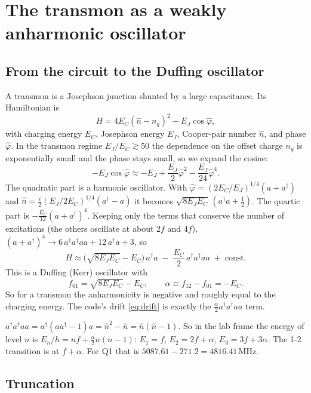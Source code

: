 \documentclass[11pt,a4paper]{article}
\newcommand{\ad}{a^{\dagger}}
\newcommand{\MHz}{\,\mathrm{MHz}}
\begin{document}
\section{The transmon as a weakly anharmonic oscillator}\label{sec:transmon}

\subsection{From the circuit to the Duffing oscillator}

A transmon is a Josephson junction shunted by a large capacitance. Its Hamiltonian is \cite{koch2007}
\[
H = 4E_C(\hat n - n_g)^2 - E_J\cos\hat\varphi ,
\]
with charging energy \(E_C\), Josephson energy \(E_J\), Cooper-pair number \(\hat n\), and phase \(\hat\varphi\). In the
transmon regime \(E_J/E_C \gtrsim 50\) the dependence on the offset charge \(n_g\) is exponentially small and the phase
stays small, so we expand the cosine:
\[
-E_J\cos\hat\varphi \approx -E_J + \frac{E_J}{2}\hat\varphi^2 - \frac{E_J}{24}\hat\varphi^4 .
\]
The quadratic part is a harmonic oscillator. With
\(\hat\varphi = (2E_C/E_J)^{1/4}(a + \ad)\) and \(\hat n = \tfrac{i}{2}(E_J/2E_C)^{1/4}(\ad - a)\) it becomes
\(\sqrt{8E_JE_C}\,(\ad a + \tfrac12)\). The quartic part is \(-\tfrac{E_C}{12}(a+\ad)^4\). Keeping only the terms that
conserve the number of excitations (the others oscillate at about \(2f\) and \(4f\)),
\((a+\ad)^4 \to 6\,\ad\ad aa + 12\,\ad a + 3\), so
\[
H \approx \big(\sqrt{8E_JE_C} - E_C\big)\,\ad a \;-\; \frac{E_C}{2}\,\ad\ad aa \;+\;\text{const}.
\]
This is a Duffing (Kerr) oscillator with
\[
f_{01} = \sqrt{8E_JE_C} - E_C, \qquad \alpha \equiv f_{12} - f_{01} = -E_C .
\]
So for a transmon the anharmonicity is negative and roughly equal to the charging energy. The code's drift
\cref{eq:drift} is exactly the \(\tfrac{\alpha}{2}\ad\ad aa\) term.

\begin{keybox}
\(\ad\ad aa = \ad(a\ad - 1)a = \hat n^2 - \hat n = \hat n(\hat n-1)\). So in the lab frame the energy of level \(n\) is
\(E_n/h = n f + \tfrac{\alpha}{2}n(n-1)\): \(E_1 = f\), \(E_2 = 2f+\alpha\), \(E_3 = 3f + 3\alpha\). The 1-2 transition is at
\(f+\alpha\). For Q1 that is \(5087.61 - 271.2 = 4816.41\MHz\).
\end{keybox}

\subsection{Truncation}
\end{document}
